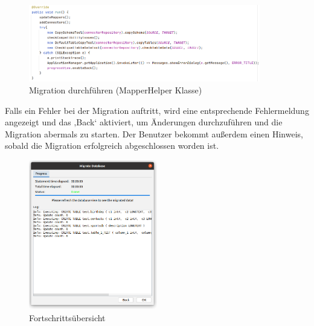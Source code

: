 	\begin{figure}[H]
		\centering
		\includegraphics[width=0.9\textwidth]{images/ui/run}
		\caption{Migration durchführen (MapperHelper Klasse)}
		\label{img:ui:run}
	\end{figure}
	Falls ein Fehler bei der Migration auftritt, wird eine entsprechende Fehlermeldung angezeigt und das ‚Back‘ aktiviert, um Änderungen durchzuführen und die Migration abermals zu starten. Der Benutzer bekommt außerdem einen Hinweis, sobald die Migration erfolgreich abgeschlossen worden ist.
	
	\begin{figure}[H]
		\centering
		\includegraphics[width=0.5\textwidth]{images/ui/progressView}
		\caption{Fortschrittsübersicht}
		\label{img:ui:progressView}
	\end{figure}
